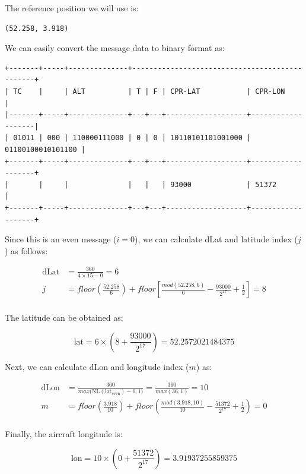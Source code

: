 The reference position we will use is:

\begin{verbatim}
(52.258, 3.918)
\end{verbatim}

We can easily convert the message data to binary format as:

\begin{verbatim}
+-------+-----+--------------+-----------------------------------------------+
| TC    |     | ALT          | T | F | CPR-LAT           | CPR-LON           |
|-------+-----+--------------+---+---+-------------------+-------------------|
| 01011 | 000 | 110000111000 | 0 | 0 | 10110101101001000 | 01100100010101100 |
+-------+-----+--------------+---+---+-------------------+-------------------+
|       |     |              |   |   | 93000             | 51372             |
+-------+-----+--------------+---+---+-------------------+-------------------+
\end{verbatim}

Since this is an even message ($i=0$), we can calculate dLat and latitude index ($j$) as follows:

\begin{align}
  \mathrm{dLat} &= \frac{360}{4 \times 15 - 0} = 6 \\
  j &= floor \left( \frac{52.258}{6} \right) + floor \left[ \frac{mod(52.258, 6)}{6} - \frac{93000}{2^{17}}  + \frac{1}{2} \right] = 8 \\
\end{align}

The latitude can be obtained as:

\begin{equation}
  \mathrm{lat} = 6 \times \left( 8 + \frac{93000}{2^{17}} \right) = 52.2572021484375
\end{equation}

Next, we can calculate dLon and longitude index ($m$) as:

\begin{align}
  \mathrm{dLon} &= \frac{360}{max \Big( \mathrm{NL}(\mathrm{lat}_\mathrm{even})-0, 1 \Big)} = \frac{360}{max(36, 1)} = 10 \\
  m &= floor \left( \frac{3.918}{10} \right) + floor \left( \frac{mod(3.918, 10)}{10} - \frac{51372}{2^{17}}  + \frac{1}{2}  \right) = 0 \\
\end{align}


Finally, the aircraft longitude is:

\begin{equation}
  \mathrm{lon} = 10 \times \left(0 + \frac{51372}{2^{17}} \right) = 3.91937255859375
\end{equation}


